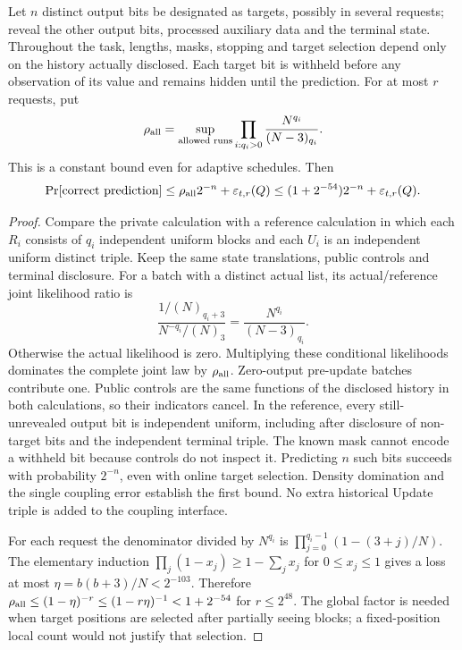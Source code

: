 \documentclass[journal=tosc,preprint,floatrow,nohyperxmp]{iacrtrans}
\numberwithin{lemma}{section}
\numberwithin{proposition}{section}
\newcommand{\fall}[2]{(#1)_{#2}}
\numberwithin{equation}{section}
\theoremstyle{definition}
\numberwithin{definition}{section}
\theoremstyle{plain}
\begin{document}
\begin{proposition}\label{prop:prediction}
Let $n$ distinct output bits be designated as targets, possibly in several requests; reveal the other output bits, processed auxiliary data and the terminal state. Throughout the task, lengths, masks, stopping and target selection depend only on the history actually disclosed. Each target bit is withheld before any observation of its value and remains hidden until the prediction. For at most $r$ requests, put
\[
 \rho_{\rm all}=\sup_{\text{allowed runs}}\prod_{i:q_i>0}\frac{N^{q_i}}{\fall{N-3}{q_i}}.
\]
This is a constant bound even for adaptive schedules. Then
\begin{equation}
 \Pr[\text{correct prediction}]\le
 \rho_{\rm all}2^{-n}+\varepsilon_{t,r}(Q)
 \le (1+2^{-54})2^{-n}+\varepsilon_{t,r}(Q).
 \label{eq:prediction}
\end{equation}

\end{proposition}
\begin{proof}
Compare the private calculation with a reference calculation in which each $R_i$ consists of $q_i$ independent uniform blocks and each $U_i$ is an independent uniform distinct triple. Keep the same state translations, public controls and terminal disclosure. For a batch with a distinct actual list, its actual/reference joint likelihood ratio is
\[
 \frac{1/\fall N{q_i+3}}{N^{-q_i}/\fall N3}
 =\frac{N^{q_i}}{\fall{N-3}{q_i}}.
\]
Otherwise the actual likelihood is zero. Multiplying these conditional likelihoods dominates the complete joint law by $\rho_{\rm all}$. Zero-output pre-update batches contribute one. Public controls are the same functions of the disclosed history in both calculations, so their indicators cancel. In the reference, every still-unrevealed output bit is independent uniform, including after disclosure of non-target bits and the independent terminal triple. The known mask cannot encode a withheld bit because controls do not inspect it. Predicting $n$ such bits succeeds with probability $2^{-n}$, even with online target selection. Density domination and the single coupling error establish the first bound. No extra historical Update triple is added to the coupling interface.

For each request the denominator divided by $N^{q_i}$ is $\prod_{j=0}^{q_i-1}(1-(3+j)/N)$. The elementary induction $\prod_j(1-x_j)\ge1-\sum_jx_j$ for $0\le x_j\le1$ gives a loss at most $\eta=b(b+3)/N<2^{-103}$. Therefore $\rho_{\rm all}\le(1-\eta)^{-r}\le(1-r\eta)^{-1}<1+2^{-54}$ for $r\le2^{48}$. The global factor is needed when target positions are selected after partially seeing blocks; a fixed-position local count would not justify that selection.
\end{proof}
\end{document}
